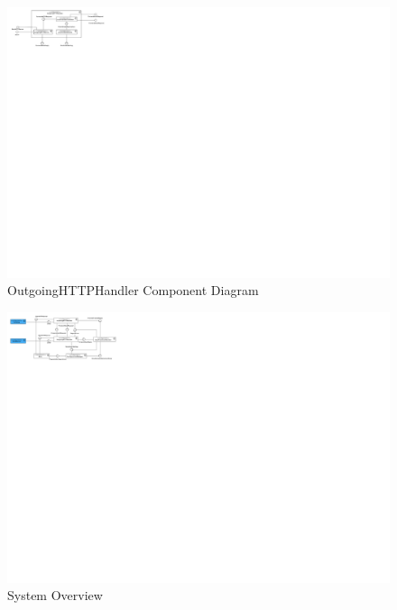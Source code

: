 
\begin{figure}[!htp]
  \centering
  \includegraphics[width=\maxwidth{\textwidth}]{appendices/architecture/images/ComponentDiagram-OutgoingHTTPHandler-Component-Diagram.pdf}
  \caption[OutgoingHTTPHandler Component Diagram]{OutgoingHTTPHandler Component Diagram \label{diag:Component:OutgoingHTTPHandlerComponentDiagram}}
\end{figure}


\begin{figure}[!htp]
  \centering
  \includegraphics[width=\maxwidth{\textwidth}]{appendices/architecture/images/ComponentDiagram-System-Overview.pdf}
  \caption[System Overview]{System Overview \label{diag:Component:SystemOverview}}
\end{figure}



